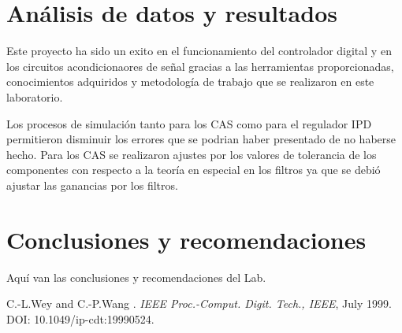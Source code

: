\documentclass[12pt,a4paper]{article} %
\begin{document}
\section{Análisis de datos y resultados}

Este proyecto ha sido un exito en el funcionamiento del controlador digital y en los circuitos acondicionaores de señal gracias a las herramientas proporcionadas, conocimientos adquiridos y metodología de trabajo que se realizaron en este laboratorio.

Los procesos de simulación tanto para los CAS como para el regulador IPD permitieron disminuir los errores que se podrian haber presentado de no haberse hecho. Para los CAS se realizaron ajustes por los valores de tolerancia de los componentes con respecto a la teoría en especial en los filtros ya que se debió ajustar las ganancias por los filtros.






\section{Conclusiones y recomendaciones}

Aquí van las conclusiones y recomendaciones del Lab.

\begin{thebibliography}{3}


C.-L.Wey and C.-P.Wang
.
\newblock \emph{IEEE Proc.-Comput. Digit. Tech., IEEE}, July 1999.
\newblock DOI: 10.1049/ip-cdt:19990524.

\end{thebibliography}
\end{document}

